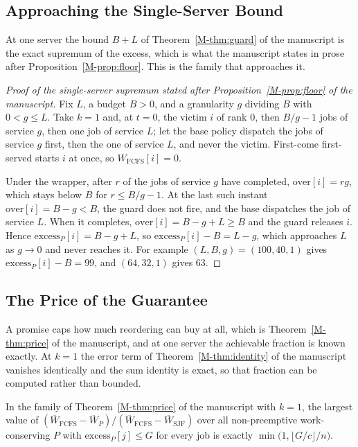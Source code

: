 \documentclass[mathematics,supfile,submit,moreauthors]{Definitions/mdpi}
\begin{document}
\subsection{Approaching the Single-Server Bound}
\label{sec:supp_floor}

At one server the bound $B+L$ of Theorem~\ref*{M-thm:guard} of the manuscript is the exact supremum of
the excess, which is what the manuscript states in prose after Proposition~\ref*{M-prop:floor}. This is
the family that approaches it.

\begin{proof}[Proof of the single-server supremum stated after Proposition~\ref*{M-prop:floor} of the manuscript]
Fix $L$, a budget $B>0$, and a granularity $g$ dividing $B$ with $0 < g \le L$.
Take $k = 1$ and, at $t = 0$, the victim $i$ of rank $0$, then $B/g - 1$ jobs of
service $g$, then one job of service $L$; let the base policy dispatch the jobs
of service $g$ first, then the one of service $L$, and never the victim.
First-come first-served starts $i$ at once, so $W_{\mathrm{FCFS}}[i] = 0$.

Under the wrapper, after $r$ of the jobs of service $g$ have completed,
$\mathrm{over}[i] = rg$, which stays below $B$ for $r \le B/g - 1$. At the last
such instant $\mathrm{over}[i] = B - g < B$, the guard does not fire, and the
base dispatches the job of service $L$. When it completes,
$\mathrm{over}[i] = B - g + L \ge B$ and the guard releases $i$. Hence
$\mathrm{excess}_P[i] = B - g + L$, so $\mathrm{excess}_P[i] - B = L - g$, which
approaches $L$ as $g \to 0$ and never reaches it. For example
$(L, B, g) = (100, 40, 1)$ gives $\mathrm{excess}_P[i] - B = 99$, and
$(64, 32, 1)$ gives $63$.
\end{proof}

\subsection{The Price of the Guarantee}
\label{sec:supp_price}

A promise caps how much reordering can buy at all, which is Theorem~\ref*{M-thm:price} of the manuscript,
and at one server the achievable fraction is known exactly. At $k = 1$ the error term of
Theorem~\ref*{M-thm:identity} of the manuscript vanishes identically and the sum identity is exact, so that
fraction can be computed rather than bounded.

\begin{proposition}
\label{prop:s_k1frac}
In the family of Theorem~\ref*{M-thm:price} of the manuscript with $k = 1$, the largest value of
$(\overline{W}_{\mathrm{FCFS}} - \overline{W}_{P})
 /(\overline{W}_{\mathrm{FCFS}} - \overline{W}_{\mathrm{SJF}})$
over all non-preemptive work-conserving $P$ with
$\mathrm{excess}_P[j] \le G$ for every job is exactly
$\min\bigl(1, \lfloor G/c \rfloor / n\bigr)$.
\end{proposition}
\end{document}
